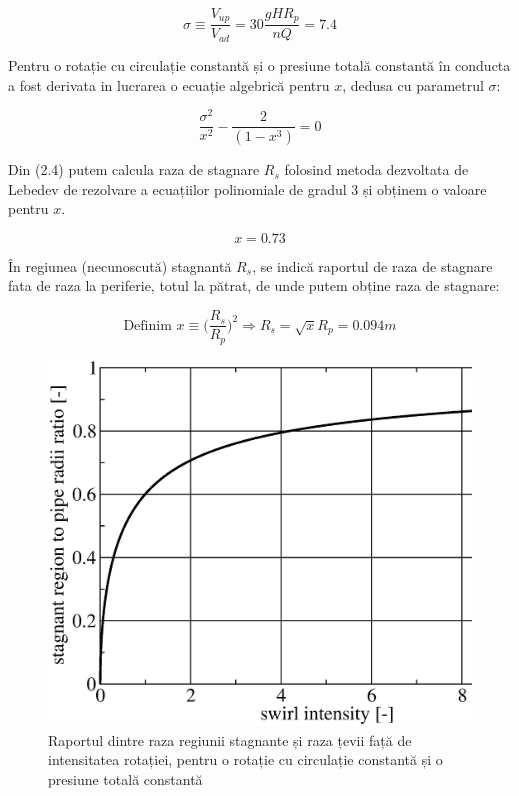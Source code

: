 \begin{equation}
\sigma \equiv \frac{V_{up}}{V_{ad}} = 30 \frac{g H R_{p}}{n Q} = 7.4
\end{equation}

Pentru o rotație cu circulație constantă și o presiune totală constantă în conducta a fost derivata in lucrarea \cite{susanhub} o ecuație algebrică pentru $x$, dedusa cu parametrul $\sigma$:

\begin{equation}
\frac{\sigma^2}{x^2} - \frac{2}{(1-x^3)} = 0
\end{equation}

Din (2.4) putem calcula raza de stagnare $R_{s}$ folosind metoda dezvoltata de Lebedev \cite{lebedev1991formulae} de rezolvare a ecuațiilor polinomiale de gradul 3 și obținem o valoare pentru $x$.

\begin{equation}
x = 0.73
\end{equation}

În regiunea (necunoscută) stagnantă $R_{s}$, se indică raportul de raza de stagnare fata de raza la periferie, totul la pătrat, de unde putem obține raza de stagnare:

\begin{equation}
\text{Definim } x \equiv \bigg(\frac{R_{s}}{R_{p}}\bigg)^2 \Rightarrow R_{s} = \sqrt{x} R_{p} = 0.094\si{m}
\end{equation}

\begin{figure}[h!]
	\centering
	\includegraphics[scale=0.6]{figures/radius_stag-sigma.eps}
	\caption{Raportul dintre raza regiunii stagnante și raza țevii față de intensitatea rotației, pentru o rotație cu circulație constantă și o presiune totală constantă \cite{susanhub}}
	\label{Raportul dintre raza regiunii stagnante și raza țevii față de intensitatea rotației}
\end{figure}

